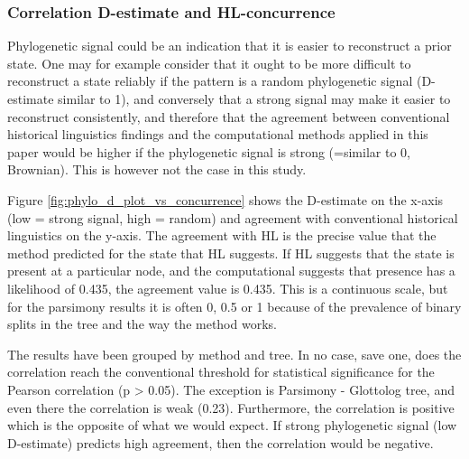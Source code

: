 \documentclass[12pt,letterpaper]{article}
\begin{document}
\FloatBarrier


\subsubsection{Correlation D-estimate and HL-concurrence}
\label{supp:cor_d_HL}
Phylogenetic signal could be an indication that it is easier to reconstruct a prior state. One may for example consider that it ought to be more difficult to reconstruct a state reliably if the pattern is a random phylogenetic signal (D-estimate similar to 1), and conversely that a strong signal may make it easier to reconstruct consistently, and therefore that the agreement between conventional historical linguistics findings and the computational methods applied in this paper would be higher if the phylogenetic signal is strong (=similar to 0, Brownian). This is however not the case in this study.

Figure \ref{fig:phylo_d_plot_vs_concurrence} shows the D-estimate on the x-axis (low = strong signal, high = random) and agreement with conventional historical linguistics on the y-axis. The agreement with HL is the precise value that the method predicted for the state that HL suggests. If HL suggests that the state is present at a particular node, and the computational suggests that presence has a likelihood of 0.435, the agreement value is 0.435. This is a continuous scale, but for the parsimony results it is often 0, 0.5 or 1 because of the prevalence of binary splits in the tree and the way the method works.

The results have been grouped by method and tree. In no case, save one, does the correlation reach the conventional threshold for statistical significance for the Pearson correlation (p > 0.05). The exception is Parsimony - Glottolog tree, and even there the correlation is weak (0.23). Furthermore, the correlation is positive which is the opposite of what we would expect. If strong phylogenetic signal (low D-estimate) predicts high agreement, then the correlation would be negative. 
\end{document}
